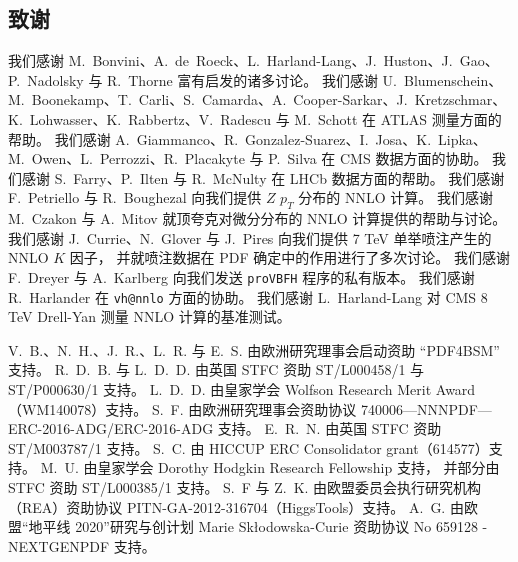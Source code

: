 \subsection*{致谢}

我们感谢 M.~Bonvini、A.~de~Roeck、L.~Harland-Lang、J.~Huston、J.~Gao、P.~Nadolsky 与 R.~Thorne
富有启发的诸多讨论。
%
我们感谢 U.~Blumenschein、M.~Boonekamp、T.~Carli、S.~Camarda、A.~Cooper-Sarkar、J.~Kretzschmar、K.~Lohwasser、K.~Rabbertz、V.~Radescu 与 M.~Schott
在 ATLAS 测量方面的帮助。
%
我们感谢 A.~Giammanco、R.~Gonzalez-Suarez、I.~Josa、K.~Lipka、M.~Owen、L.~Perrozzi、R.~Placakyte 与 P.~Silva
在 CMS 数据方面的协助。
%
我们感谢 S.~Farry、P.~Ilten 与 R.~McNulty 在 LHCb 数据方面的帮助。
%
我们感谢 F.~Petriello 与 R.~Boughezal 向我们提供 $Z$ $p_T$ 分布的 NNLO 计算。
%
我们感谢 M.~Czakon 与 A.~Mitov 就顶夸克对微分分布的 NNLO 计算提供的帮助与讨论。
%
我们感谢 J.~Currie、N.~Glover 与 J.~Pires 向我们提供 7 TeV 单举喷注产生的 NNLO $K$ 因子，
并就喷注数据在 PDF 确定中的作用进行了多次讨论。
%
我们感谢 F.~Dreyer 与 A.~Karlberg 向我们发送 {\tt proVBFH} 程序的私有版本。
%
我们感谢 R.~Harlander 在 {\tt vh@nnlo} 方面的协助。
%
我们感谢 L.~Harland-Lang 对 CMS 8 TeV Drell-Yan 测量 NNLO 计算的基准测试。

V.~B.、N.~H.、J.~R.、L.~R. 与 E.~S. 由欧洲研究理事会启动资助 ``PDF4BSM'' 支持。
%
R.~D.~B. 与 L.~D.~D. 由英国 STFC 资助 ST/L000458/1 与 ST/P000630/1 支持。
%
L.~D.~D. 由皇家学会 Wolfson Research Merit Award（WM140078）支持。
%
S.~F. 由欧洲研究理事会资助协议 740006—NNNPDF—ERC-2016-ADG/ERC-2016-ADG 支持。
E.~R.~N. 由英国 STFC 资助 ST/M003787/1 支持。
%
S.~C. 由 HICCUP ERC Consolidator grant（614577）支持。
%
M.~U. 由皇家学会 Dorothy Hodgkin Research Fellowship 支持，
并部分由 STFC 资助 ST/L000385/1 支持。
%
S.~F 与 Z.~K. 由欧盟委员会执行研究机构（REA）资助协议 PITN-GA-2012-316704（HiggsTools）支持。
%
A.~G. 由欧盟“地平线 2020”研究与创计划 Marie Sk\l odowska-Curie 资助协议 No 659128 - NEXTGENPDF 支持。
